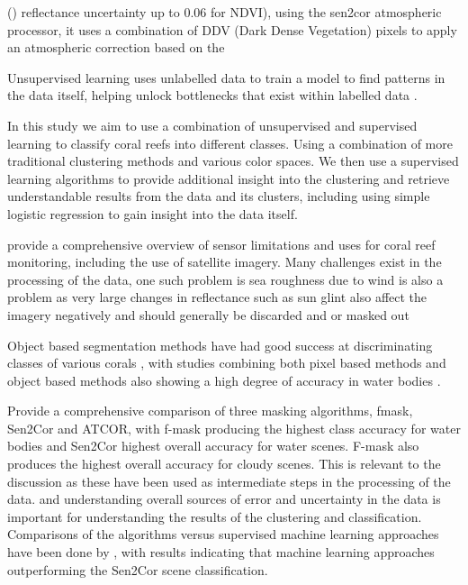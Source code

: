 \documentclass[journal,article,submit,pdftex,moreauthors]{Definitions/mdpi}
\begin{document}
()\cite{louis2016sentinel} reflectance uncertainty up to 0.06 for NDVI), using the sen2cor atmospheric processor, it uses a combination of DDV (Dark Dense Vegetation) pixels to apply an atmospheric correction based on the \cite{atmospheric_correction1988}

Unsupervised learning uses unlabelled data to train a model to find patterns in the data itself, helping unlock bottlenecks that exist within labelled data \cite{usama2019unsupervised}.

In this study we aim to use a combination of unsupervised and supervised learning to classify coral reefs into different classes. Using a combination of more traditional clustering methods and various color spaces. 
We then use a supervised learning algorithms to provide additional insight into the clustering and 
retrieve understandable results from the data and its clusters, including using simple logistic regression to gain insight into the data itself.

\citep{Hedley2016} provide a comprehensive overview of sensor limitations and uses for coral reef monitoring, including the use of satellite imagery. Many challenges exist in the processing of the data, one such problem is 
sea roughness due to wind is also a problem as very large changes in reflectance such as sun glint also affect the imagery negatively  and should generally be discarded and or masked out \cite{gordon1997atmospheric}

Object based segmentation methods have had good success at discriminating classes of various corals \cite{Nguyen2021}, with studies combining both pixel based methods and object based methods 
also showing a high degree of accuracy in water bodies \cite{huang2015combining}.


\cite{zekoll2021comparison} Provide a comprehensive comparison of three masking algorithms, fmask, Sen2Cor and ATCOR, with f-mask producing the highest class accuracy for water bodies and Sen2Cor 
highest overall accuracy for water scenes. F-mask also produces the highest overall accuracy for cloudy scenes. This is relevant to the discussion as these have been used as intermediate steps in the processing of the data.
and understanding overall sources of error and uncertainty in the data is important for understanding the results of the clustering and classification. Comparisons of the algorithms versus supervised machine learning approaches have been
done by \cite{raiyani2021sentinel}, with results indicating that machine learning approaches outperforming the Sen2Cor scene classification.
\end{document}
